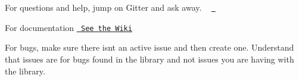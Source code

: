 For questions and help, jump on Gitter and ask away. ~\newline
 \href{https://gitter.im/Makuna/Rtc?utm_source=badge&utm_medium=badge&utm_campaign=pr-badge}{\texttt{ }}

For documentation \href{https://github.com/Makuna/Rtc/wiki}{\texttt{ See the Wiki}}

For bugs, make sure there isn\textquotesingle{}t an active issue and then create one. Understand that issues are for bugs found in the library and not issues you are having with the library. ~\newline
 